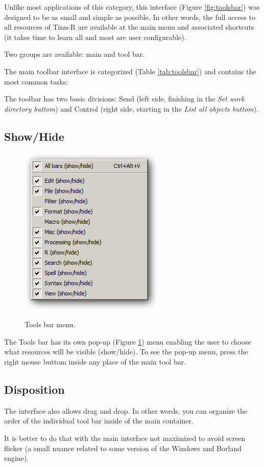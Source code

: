 Unlike most applications of this category, this interface
(Figure \ref{fig:toolsbar})
was designed to be
as small and simple as possible. In other words, the full access to all
resources of Tinn-R are available at the main menu and associated shortcuts
(it takes time to learn all and most are user configurable).

Two groups are available: main and \RR{} tool bar.

The main toolbar interface is categorized
(Table \ref{tab:toolsbar})
and contains the most common tasks:

The \RR{} toolbar has two basic divisions: Send (left side, finishing in the
\textit{Set work directory buttom}) and Control (right side, starting
in the \textit{List all objects buttom}).


\hypertarget{working_toolsbar_showhide}{}
\subsection{Show/Hide}

\begin{figure}[h!]
  \includegraphics[scale=0.35]{./res/toolsbar_pmenu.png}\\
  \caption{Tools bar menu.}
  \label{fig:toolsbar_pmenu}
\end{figure}

The Tools bar has its own pop-up
(Figure \ref{fig:toolsbar_pmenu})
menu enabling the user to choose what
resources will be visible (show/hide). To see the pop-up menu, press the
right mouse buttom inside any place of the main tool bar.


\hypertarget{working_toolsbar_disposition}{}
\subsection{Disposition}

The interface also allows drag and drop. In other words, you can organize
the order of the individual tool bar inside of the main container.

It is better to do that with the main interface not maximized to avoid
screen flicker (a small nuance related to some version of the Windows
and Borland engine).
